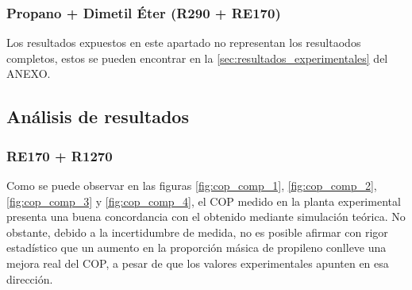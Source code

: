\documentclass[../main.tex]{subfiles}
\begin{document}
\begin{table}[ht]
    \centering
    
    \caption{Resultados experintales RE170 / R1270 (85\% / 15\%)}
    \label{fig:res_exp_RE170_R1270_85_15_memoria}
\end{table}

\begin{table}[ht]
    \centering
    
    \caption{Resultados experintales RE170 / R1270 (80\% / 20\%)}
    \label{fig:res_exp_RE170_R1270_80_20_memoria}
\end{table}

\FloatBarrier

\newpage
\subsubsection{Propano + Dimetil Éter (R290 + RE170)}

\begin{table}[ht]
    \centering
    
    \caption{Resultados experintales R290 / RE170 (85\% / 15\%)}
    \label{fig:res_exp_R290_RE170_85_15_memoria}
\end{table}

\FloatBarrier

Los resultados expuestos en este apartado no representan los resultaodos completos, estos se pueden encontrar en la \autoref{sec:resultados_experimentales} del ANEXO.

\newpage
\subsection{Análisis de resultados}

\subsubsection{RE170 + R1270}

Como se puede observar en las figuras \ref{fig:cop_comp_1}, \ref{fig:cop_comp_2}, \ref{fig:cop_comp_3} y \ref{fig:cop_comp_4}, el COP medido en la planta experimental presenta una buena concordancia con el obtenido mediante simulación teórica. No obstante, debido a la incertidumbre de medida, no es posible afirmar con rigor estadístico que un aumento en la proporción másica de propileno conlleve una mejora real del COP, a pesar de que los valores experimentales apunten en esa dirección.
\end{document}
